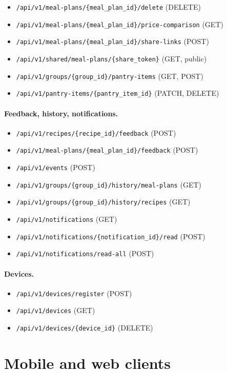 \begin{itemize}
\item \texttt{/api/v1/meal-plans/\{meal\_plan\_id\}/delete} (DELETE)
\item \texttt{/api/v1/meal-plans/\{meal\_plan\_id\}/price-comparison} (GET)
\item \texttt{/api/v1/meal-plans/\{meal\_plan\_id\}/share-links} (POST)
\item \texttt{/api/v1/shared/meal-plans/\{share\_token\}} (GET, public)
\item \texttt{/api/v1/groups/\{group\_id\}/pantry-items} (GET, POST)
\item \texttt{/api/v1/pantry-items/\{pantry\_item\_id\}} (PATCH, DELETE)
\end{itemize}

\paragraph{Feedback, history, notifications.}
\begin{itemize}
\item \texttt{/api/v1/recipes/\{recipe\_id\}/feedback} (POST)
\item \texttt{/api/v1/meal-plans/\{meal\_plan\_id\}/feedback} (POST)
\item \texttt{/api/v1/events} (POST)
\item \texttt{/api/v1/groups/\{group\_id\}/history/meal-plans} (GET)
\item \texttt{/api/v1/groups/\{group\_id\}/history/recipes} (GET)
\item \texttt{/api/v1/notifications} (GET)
\item \texttt{/api/v1/notifications/\{notification\_id\}/read} (POST)
\item \texttt{/api/v1/notifications/read-all} (POST)
\end{itemize}

\paragraph{Devices.}
\begin{itemize}
\item \texttt{/api/v1/devices/register} (POST)
\item \texttt{/api/v1/devices} (GET)
\item \texttt{/api/v1/devices/\{device\_id\}} (DELETE)
\end{itemize}

\section{Mobile and web clients}

